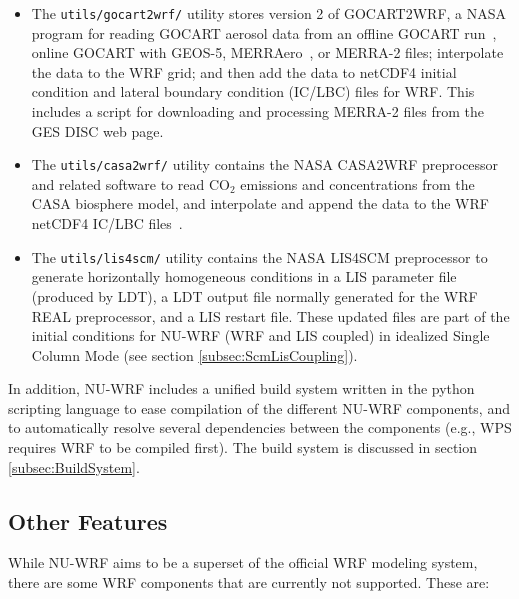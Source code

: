 \begin{itemize}
\item The \texttt{utils/gocart2wrf/} utility stores version 2 of 
  GOCART2WRF, a NASA program for reading GOCART aerosol data from an offline
  GOCART run~\citep{ref:ChinEtAl2002}, online GOCART with GEOS-5, 
  MERRAero~\citep{ref:KishchaEtAl2014}, or MERRA-2
  \citep{ref:BosilovichEtAl2015} files; interpolate the data to the WRF grid; 
  and then add the data to netCDF4 initial condition and lateral boundary 
  condition (IC/LBC) files for WRF. This includes a script for downloading and
  processing MERRA-2 files from the GES DISC web page.

\item The \texttt{utils/casa2wrf/} utility contains the NASA CASA2WRF 
  preprocessor and related software to read CO$_2$ emissions and 
  concentrations from the CASA biosphere model, and interpolate and append 
  the data to the WRF netCDF4 IC/LBC files~\citep{ref:Casa2WrfUserGuide}.

\item The \texttt{utils/lis4scm/} utility contains the NASA LIS4SCM
  preprocessor to generate horizontally homogeneous conditions in a LIS 
  parameter file (produced by LDT), a LDT output file normally generated for 
  the WRF REAL preprocessor, and a LIS restart file.  These updated files are 
  part of the initial conditions for NU-WRF (WRF and LIS coupled) in idealized 
  Single Column Mode (see section \ref{subsec:ScmLisCoupling}).

\end{itemize}

In addition, NU-WRF includes a unified build system written in the python 
scripting language to ease compilation of the different NU-WRF components, 
and to automatically resolve several dependencies between the components 
(e.g., WPS requires WRF to be compiled first). The build system is discussed
in section \ref{subsec:BuildSystem}.

\subsection{Other Features}

While NU-WRF aims to be a superset of the official WRF modeling system,
there are some WRF components that are currently not supported. These are:

